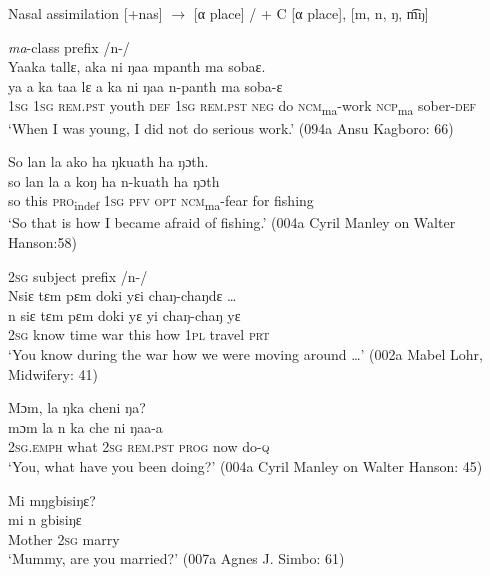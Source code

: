 \ea%
\label{ex:35} Nasal assimilation
\ea \label{ex:35a}
[+nas] $\xrightarrow{}$ [α place] / {\longrule} + C [α place], [m, n, ŋ, m͡ŋ]

\ex\label{ex:35b} \textit{ma}{}-class prefix /n-/\\
\ea Yaaka tallɛ, aka ni ŋaa mpanth ma sobaɛ.\\
\gll ya    a    ka      taa      lɛ    a    ka      ni    ŋaa  n-panth      ma    soba-ɛ\\
\textsc{1sg}  \textsc{1sg}  \textsc{rem.pst}  youth    \textsc{def}  \textsc{1sg}  \textsc{rem.pst}  \textsc{neg}  do    \textsc{ncm}\textsubscript{ma}{}-work  \textsc{ncp}\textsubscript{ma}    sober-\textsc{def}\\
\glt ‘When I was young, I did not do serious work.' (094a Ansu Kagboro:  66)

\ex So lan la ako ha ŋkuath ha ŋɔth.\\
\gll so  lan  la      a    koŋ    ha    n-kuath    ha    ŋɔth\\
so  this  \textsc{pro}\textsubscript{indef}  \textsc{1sg}  \textsc{pfv}    \textsc{opt}  \textsc{ncm}\textsubscript{ma}{}-fear  for    fishing\\
\glt ‘So that is how I became afraid of fishing.' (004a Cyril Manley on Walter Hanson:58)
\z

\ex \label{ex:35c} \textsc{2sg} subject prefix /n-/\\
\ea Nsiɛ tɛm pɛm doki yɛi chaŋ-chaŋdɛ …\\
\gll n    siɛ      tɛm  pɛm  doki  yɛ    yi    chaŋ-chaŋ  yɛ\\
\textsc{2sg}  know    time  war  this  how  \textsc{1pl}  travel      \textsc{prt}\\
\glt ‘You know during the war how we were moving around …' (002a Mabel Lohr, Midwifery: 41)

\ex Mɔm, la ŋka cheni ŋa?\\
\gll mɔm      la    n    ka      che  ni    ŋaa-a\\
\textsc{2sg.emph}  what  \textsc{2sg}  \textsc{rem.pst}  \textsc{prog}  now  do-\textsc{q}\\
\glt ‘You, what have you been doing?' (004a Cyril Manley on Walter Hanson: 45)

\ex Mi mŋgbisiŋɛ?\\
\gll mi      n    gbisiŋɛ\\
Mother  \textsc{2sg}  marry\\
\glt ‘Mummy, are you married?' (007a Agnes J. Simbo: 61)
\z
\z
\z

